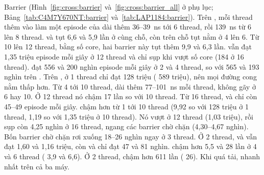 Barrier (Hình~\ref{fig:cross:barrier} và~\ref{fig:cross:barrier_all} ở phụ lục; Bảng~\ref{tab:C4M7Y670NT:barrier} và~\ref{tab:LAP1184:barrier}).
Trên , mỗi thread thêm vào làm một episode của  dài thêm 36--39~ns tới 6
thread, rồi 139~ns từ 6 lên 8 thread.  và  tụt 6,6 và 5,9 lần ở cùng
chỗ, còn trên  chỗ tụt nằm ở 4 lên 6. Từ 10 lên 12 thread, bằng số core, hai barrier này
tụt thêm 9,9 và 6,3 lần.  vẫn đạt 1,35 triệu episode mỗi giây ở 12 thread và chỉ sụp khi vượt số core (184 ở 16 thread).  đạt 556 và 200 nghìn episode mỗi
giây ở 2 và 4 thread, so với 565 và 193 nghìn trên . Trên ,  ở
1 thread chỉ đạt 128 triệu ( 589 triệu), nên mọi đường cong nằm thấp hơn. Từ 4 tới 10
thread,  dài thêm 77--101~ns mỗi thread, không gãy ở 6 hay 10. Ở 12 thread nó chậm 17 lần so
với 10 thread. Từ 16 thread,  và  chỉ còn 45--49 episode mỗi giây.
 chậm hơn  từ 1 tới 10 thread (9,92 so với 128 triệu ở 1 thread, 1,19 so
với 1,35 triệu ở 10 thread). Nó vượt  ở 12 thread (1,03 triệu), rồi sụp còn 4,25 nghìn ở 16
thread, ngang các barrier chờ chặn (4,30--4,67 nghìn). Bốn barrier chờ chặn rơi xuống 18--26 nghìn ngay
ở 3 thread. Ở 2 thread,  và  vẫn đạt 1,60 và 1,16 triệu, còn
 và  chỉ đạt 47 và 81 nghìn.  chậm hơn
 5,5 và 28 lần ở 4 và 6 thread ( 3,9 và 6,6). Ở 2 thread, 
chậm hơn  611 lần ( 26). Khi quá tải,  nhanh nhất trên cả
ba máy.

